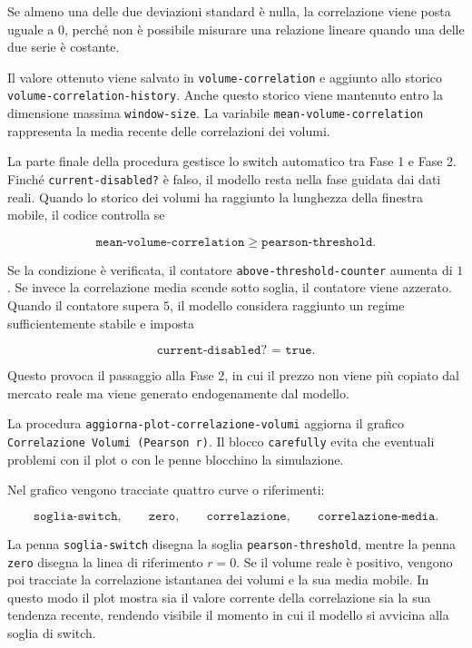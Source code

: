 Se almeno una delle due deviazioni standard è nulla, la correlazione viene posta
uguale a \(0\), perché non è possibile misurare una relazione lineare quando una
delle due serie è costante.

Il valore ottenuto viene salvato in \texttt{volume-correlation} e aggiunto allo
storico \texttt{volume-correlation-history}. Anche questo storico viene mantenuto
entro la dimensione massima \texttt{window-size}. La variabile
\texttt{mean-volume-correlation} rappresenta la media recente delle correlazioni
dei volumi.

La parte finale della procedura gestisce lo switch automatico tra Fase 1 e Fase
2. Finché \texttt{current-disabled?} è falso, il modello resta nella fase guidata
dai dati reali. Quando lo storico dei volumi ha raggiunto la lunghezza della
finestra mobile, il codice controlla se

\[
\texttt{mean-volume-correlation} \geq \texttt{pearson-threshold}.
\]

Se la condizione è verificata, il contatore
\texttt{above-threshold-counter} aumenta di \(1\). Se invece la correlazione
media scende sotto soglia, il contatore viene azzerato. Quando il contatore
supera \(5\), il modello considera raggiunto un regime sufficientemente stabile
e imposta

\[
\texttt{current-disabled? = true}.
\]

Questo provoca il passaggio alla Fase 2, in cui il prezzo non viene più copiato
dal mercato reale ma viene generato endogenamente dal modello.

La procedura \texttt{aggiorna-plot-correlazione-volumi} aggiorna il grafico
\texttt{Correlazione Volumi (Pearson r)}. Il blocco \texttt{carefully} evita che
eventuali problemi con il plot o con le penne blocchino la simulazione.

Nel grafico vengono tracciate quattro curve o riferimenti:

\[
\texttt{soglia-switch},
\qquad
\texttt{zero},
\qquad
\texttt{correlazione},
\qquad
\texttt{correlazione-media}.
\]

La penna \texttt{soglia-switch} disegna la soglia
\texttt{pearson-threshold}, mentre la penna \texttt{zero} disegna la linea di
riferimento \(r=0\). Se il volume reale è positivo, vengono poi tracciate la
correlazione istantanea dei volumi e la sua media mobile. In questo modo il plot
mostra sia il valore corrente della correlazione sia la sua tendenza recente,
rendendo visibile il momento in cui il modello si avvicina alla soglia di switch.

